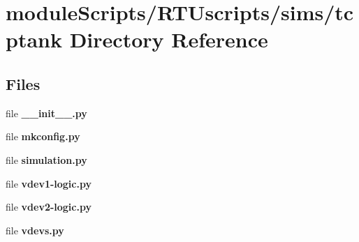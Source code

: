 \section{module\+Scripts/\+R\+T\+Uscripts/sims/tcptank Directory Reference}
\label{dir_9c9579fe879e1c0e0e7815fc2fe6180d}
\subsection*{Files}
\begin{DoxyCompactItemize}
\item 
file {\bf \+\_\+\+\_\+init\+\_\+\+\_\+.\+py}
\item 
file {\bf mkconfig.\+py}
\item 
file {\bf simulation.\+py}
\item 
file {\bf vdev1-\/logic.\+py}
\item 
file {\bf vdev2-\/logic.\+py}
\item 
file {\bf vdevs.\+py}
\end{DoxyCompactItemize}
